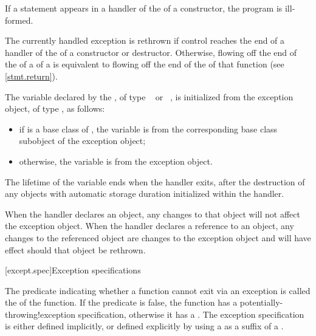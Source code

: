 \pnum
If a  statement appears in a handler of the
of a
constructor, the program is ill-formed.

\pnum
The currently handled exception
is rethrown if control reaches the end of a handler of the
of a constructor or destructor.
Otherwise, flowing off the end of
the 
of a 
of a 
is equivalent to flowing off the end of
the 
of that function (see \ref{stmt.return}).

\pnum
The variable declared by the , of type
\cv{}~ or \cv{}~, is initialized from the exception object,
of type , as follows:
\begin{itemize}
\item
if  is a base class of , the variable is
from the corresponding base class subobject
of the exception object;
\item otherwise, the variable is
from the exception object.
\end{itemize}

The lifetime of the variable ends
when the handler exits, after the
destruction of any objects with automatic storage duration initialized
within the handler.

\pnum
When the handler declares an object,
any changes to that object will not affect the exception object.
When the handler declares a reference to an object,
any changes to the referenced object are changes to the
exception object and will have effect should that object be rethrown.%
%

[except.spec]{Exception specifications}%

\pnum
The predicate indicating whether a function cannot exit via an exception
is called the  of the function.
If the predicate is false,
the function has a
%
%
{potentially-throwing!exception specification},
otherwise it has a
%
.
The exception specification is either defined implicitly,
or defined explicitly
by using a 
as a suffix of a .

